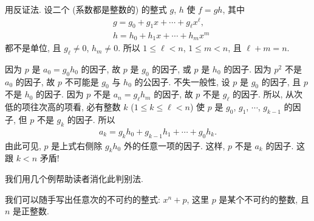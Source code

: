 \begin{pf}
    用反证法. 设二个 (系数都是整数的) 的整式 $g$, $h$ 使 $f = gh$, 其中
    \begin{align*}
         & g = g_0 + g_1 x + \cdots + g_\ell x^\ell, \\
         & h = h_0 + h_1 x + \cdots + h_m x^m
    \end{align*}
    都不是单位, 且 $g_\ell \neq 0$, $h_m \neq 0$. 所以 $1 \leq \ell < n$, $1 \leq m < n$, 且 $\ell + m = n$.

    因为 $p$ 是 $a_0 = g_0 h_0$ 的因子, 故 $p$ 是 $g_0$ 的因子, 或 $p$ 是 $h_0$ 的因子. 因为 $p^2$ 不是 $a_0$ 的因子, 故 $p$ 不可能是 $g_0$ 与 $h_0$ 的公因子. 不失一般性, 设 $p$ 是 $g_0$ 的因子, 且 $p$ 不是 $h_0$ 的因子. 因为 $p$ 不是 $a_n = g_\ell h_m$ 的因子, 故 $p$ 不是 $g_\ell$ 的因子. 所以, 从次低的项往次高的项看, 必有整数 $k$ ($1 \leq k \leq \ell < n$) 使 $p$ 是 $g_0$, $g_1$, $\cdots$, $g_{k-1}$ 的因子, 但 $p$ 不是 $g_k$ 的因子. 所以
    \begin{align*}
        a_k = g_k h_0 + g_{k-1} h_1 + \cdots + g_0 h_k.
    \end{align*}
    由此可见, $p$ 是上式右侧除 $g_k h_0$ 外的任意一项的因子. 这样, $p$ 不是 $a_k$ 的因子. 这跟 $k < n$ 矛盾!
\end{pf}

我们用几个例帮助读者消化此判别法.

\begin{example}
    我们可以随手写出任意次的不可约的整式: $x^n + p$, 这里 $p$ 是某个不可约的整数, 且 $n$ 是正整数.
\end{example}

